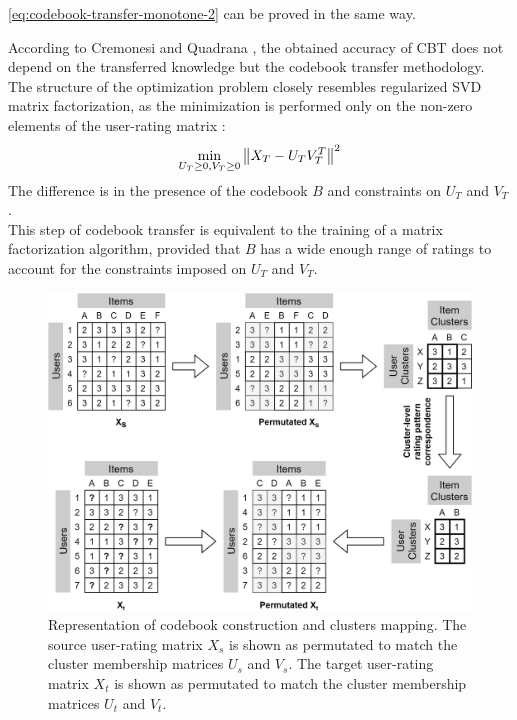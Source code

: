 \autoref{eq:codebook-transfer-monotone-2} can be proved in the same way.\par
According to Cremonesi and Quadrana \cite{10.1145/2645710.2645769}, the obtained accuracy of CBT does not depend on the transferred knowledge but the codebook transfer methodology. The structure of the optimization problem closely resembles regularized SVD matrix factorization, as the minimization is performed only on the non-zero elements of the user-rating matrix \cite{10.1145/1401890.1401944}:
\begin{equation*}
\min_{U_T \geq 0, V_T \geq 0} \left\lVert X_T - U_T V_T^T\right\rVert^2
\end{equation*}
The difference is in the presence of the codebook $B$ and constraints on $U_T$ and $V_T$.\\
This step of codebook transfer is equivalent to the training of a matrix factorization algorithm, provided that $B$ has a wide enough range of ratings to account for the constraints imposed on $U_T$ and $V_T$.
\begin{figure}[hbt]
\centering
\includegraphics[width=\textwidth]{pictures/codebook-construction}
\caption{Representation of codebook construction and clusters mapping. The source user-rating matrix $X_s$ is shown as permutated to match the cluster membership matrices $U_s$ and $V_s$. The target user-rating matrix $X_t$ is shown as permutated to match the cluster membership matrices $U_t$ and $V_t$.}
\label{fg:codebook-construction}
\end{figure}
